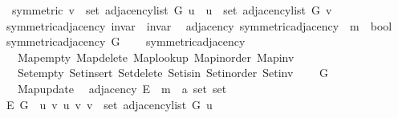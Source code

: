\begin{isabellebody}
\ \ \ symmetric{\isacharcolon}{\kern0pt}\ {\isachardoublequoteopen}v\ {\isasymin}\ set\ {\isacharparenleft}{\kern0pt}adjacency{\isacharunderscore}{\kern0pt}list\ G\ u{\isacharparenright}{\kern0pt}\ {\isasymlongleftrightarrow}\ u\ {\isasymin}\ set\ {\isacharparenleft}{\kern0pt}adjacency{\isacharunderscore}{\kern0pt}list\ G\ v{\isacharparenright}{\kern0pt}{\isachardoublequoteclose}\isanewline
%
\isadeliminvisible
\isanewline
%
\endisadeliminvisible
%
\isataginvisible
{}\isamarkupfalse%
\ {\isacharparenleft}{\kern0pt}\ symmetric{\isacharunderscore}{\kern0pt}adjacency{\isacharparenright}{\kern0pt}\ invar\ {\isacharequal}{\kern0pt}\ invar\isanewline
\isanewline
{}\isamarkupfalse%
\ {\isacharparenleft}{\kern0pt}\ adjacency{\isacharparenright}{\kern0pt}\ symmetric{\isacharunderscore}{\kern0pt}adjacency{\isacharprime}{\kern0pt}\ {\isacharcolon}{\kern0pt}{\isacharcolon}{\kern0pt}\ {\isachardoublequoteopen}{\isacharprime}{\kern0pt}m\ {\isasymRightarrow}\ bool{\isachardoublequoteclose}\ \isanewline
\ \ {\isachardoublequoteopen}symmetric{\isacharunderscore}{\kern0pt}adjacency{\isacharprime}{\kern0pt}\ G\ {\isasymequiv}\isanewline
\ \ \ symmetric{\isacharunderscore}{\kern0pt}adjacency\isanewline
\ \ \ \ Map{\isacharunderscore}{\kern0pt}empty\ Map{\isacharunderscore}{\kern0pt}delete\ Map{\isacharunderscore}{\kern0pt}lookup\ Map{\isacharunderscore}{\kern0pt}inorder\ Map{\isacharunderscore}{\kern0pt}inv\isanewline
\ \ \ \ Set{\isacharunderscore}{\kern0pt}empty\ Set{\isacharunderscore}{\kern0pt}insert\ Set{\isacharunderscore}{\kern0pt}delete\ Set{\isacharunderscore}{\kern0pt}isin\ Set{\isacharunderscore}{\kern0pt}inorder\ Set{\isacharunderscore}{\kern0pt}inv\isanewline
\ \ \ \ G\isanewline
\ \ \ \ Map{\isacharunderscore}{\kern0pt}update{\isachardoublequoteclose}%
\endisataginvisible
{\isafoldinvisible}%
%
\isadeliminvisible
\isanewline
%
\endisadeliminvisible
\isanewline
{}\isamarkupfalse%
\ {\isacharparenleft}{\kern0pt}\ adjacency{\isacharparenright}{\kern0pt}\ E\ {\isacharcolon}{\kern0pt}{\isacharcolon}{\kern0pt}\ {\isachardoublequoteopen}{\isacharprime}{\kern0pt}m\ {\isasymRightarrow}\ {\isacharprime}{\kern0pt}a\ set\ set{\isachardoublequoteclose}\ \isanewline
\ \ {\isachardoublequoteopen}E\ G\ {\isasymequiv}\ {\isacharbraceleft}{\kern0pt}{\isacharbraceleft}{\kern0pt}u{\isacharcomma}{\kern0pt}\ v{\isacharbraceright}{\kern0pt}\ {\isacharbar}{\kern0pt}u\ v{\isachardot}{\kern0pt}\ v\ {\isasymin}\ set\ {\isacharparenleft}{\kern0pt}adjacency{\isacharunderscore}{\kern0pt}list\ G\ u{\isacharparenright}{\kern0pt}{\isacharbraceright}{\kern0pt}{\isachardoublequoteclose}\isanewline

\end{isabellebody}
